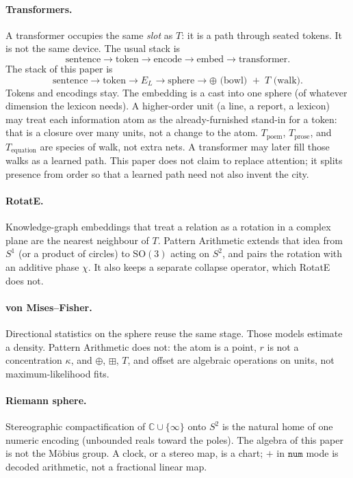 \documentclass[12pt, a4paper]{article}
\begin{document}
\paragraph{Transformers.}
A transformer occupies the same \emph{slot} as $T$: it is a path
through seated tokens. It is not the same device. The usual stack is
\[
\text{sentence}\to\text{token}\to\text{encode}\to\text{embed}\to\text{transformer}.
\]
The stack of this paper is
\[
\text{sentence}\to\text{token}\to E_L\to\text{sphere}\to
\oplus\text{ (bowl) }+\; T\text{ (walk)}.
\]
Tokens and encodings stay. The embedding is a cast into one sphere
(of whatever dimension the lexicon needs). A higher-order unit (a
line, a report, a lexicon) may treat each information atom as the
already-furnished stand-in for a token: that is a closure over many
units, not a change to the atom. $T_{\mathrm{poem}}$,
$T_{\mathrm{prose}}$, and $T_{\mathrm{equation}}$ are species of
walk, not extra nets. A transformer may later fill those walks as a
learned path. This paper does not claim to replace attention; it
splits presence from order so that a learned path need not also
invent the city.

\paragraph{RotatE.}
Knowledge-graph embeddings that treat a relation as a rotation in a
complex plane are the nearest neighbour of $T$. Pattern Arithmetic
extends that idea from $S^1$ (or a product of circles) to
$\mathrm{SO}(3)$ acting on $S^2$, and pairs the rotation with an
additive phase $\chi$. It also keeps a separate collapse operator,
which RotatE does not.

\paragraph{von Mises--Fisher.}
Directional statistics on the sphere reuse the same stage.
Those models estimate a density. Pattern Arithmetic does not: the atom
is a point, $r$ is not a concentration $\kappa$, and $\oplus$, $\boxplus$, $T$, and
offset are algebraic operations on units, not maximum-likelihood fits.

\paragraph{Riemann sphere.}
Stereographic compactification of $\mathbb{C}\cup\{\infty\}$ onto $S^2$
is the natural home of one numeric encoding (unbounded reals toward the
poles). The algebra of this paper is not the M\"obius group. A clock,
or a stereo map, is a chart; $+$ in $\mathtt{num}$ mode is decoded
arithmetic, not a fractional linear map.
\end{document}
